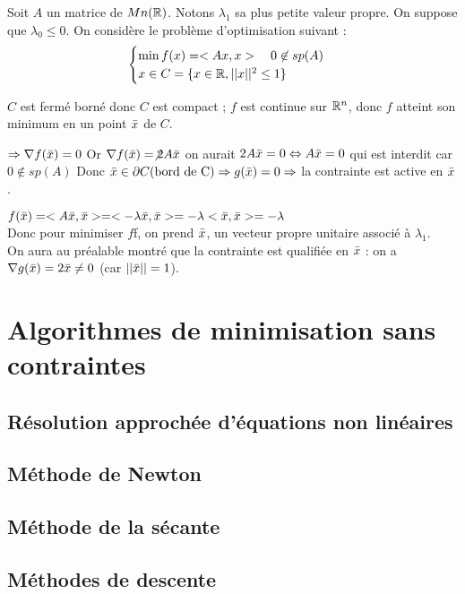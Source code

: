 \begin{exemple} %
	Soit $A$ un matrice de $Mn(\mathbb{R})$. Notons $\lambda _1$ sa plus petite valeur propre. On suppose que $\lambda _0 \leq 0$. On considère le problème d'optimisation suivant : \[ \begin{cases}\min f(x) = <Ax, x> \quad 0 \not \in sp(A)\\ x \in C = \{ x \in \mathbb{R}, ||x||^2 \leq 1 \} \end{cases} \]
	
	$C$ est fermé borné donc $C$ est compact ;
	$f$ est continue sur $\mathbb{R}^n$, donc $f$ atteint son minimum en un point $\bar{x}$ de $C$.
	
	
	$\Rightarrow \nabla f(\bar{x}) = 0$
	Or $\nabla f(\bar{x}) = \not 2A\bar{x}$
	on aurait $2A\bar{x} = 0 \Leftrightarrow A\bar{x} = 0$ qui est interdit car $0 \not \in sp(A)$
	Donc $\bar{x} \in \partial C \text{(bord de C)} \Rightarrow g(\bar{x}) = 0 \Rightarrow$ la contrainte est active en $\bar{x}$.
	
	
	$f(\bar{x}) = <A\bar{x}, \bar{x}> = <-\lambda \bar{x}, \bar{x}> = -\lambda <\bar{x}, \bar{x}> = - \lambda$ \\
	Donc pour minimiser $f$f, on prend $\bar{x}$, un vecteur propre unitaire associé à $\lambda_1$.\\
	On aura au préalable montré que la contrainte est qualifiée en $\bar{x}$ : on a $\nabla g(\bar{x}) = 2\bar{x} \ne 0$ (car $||\bar{x}||=1$).
	
\end{exemple}

\section{Algorithmes de minimisation sans contraintes}
\subsection{Résolution approchée d'équations non linéaires}
\subsection{Méthode de Newton}



\subsection{Méthode de la sécante}
\subsection{Méthodes de descente}

